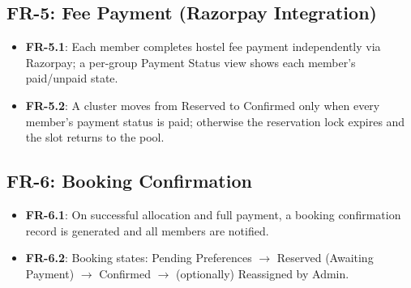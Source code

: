 \documentclass[11pt]{report}
\begin{document}
\subsection*{FR-5: Fee Payment (Razorpay Integration)}
\begin{itemize}[leftmargin=1.2cm]
    \item \textbf{FR-5.1}: Each member completes hostel fee payment independently via Razorpay; a per-group Payment Status view shows each member's paid/unpaid state.
    \item \textbf{FR-5.2}: A cluster moves from Reserved to Confirmed only when every member's payment status is paid; otherwise the reservation lock expires and the slot returns to the pool.
\end{itemize}

\subsection*{FR-6: Booking Confirmation}
\begin{itemize}[leftmargin=1.2cm]
    \item \textbf{FR-6.1}: On successful allocation and full payment, a booking confirmation record is generated and all members are notified.
    \item \textbf{FR-6.2}: Booking states: Pending Preferences $\rightarrow$ Reserved (Awaiting Payment) $\rightarrow$ Confirmed $\rightarrow$ (optionally) Reassigned by Admin.
\end{itemize}
\end{document}
